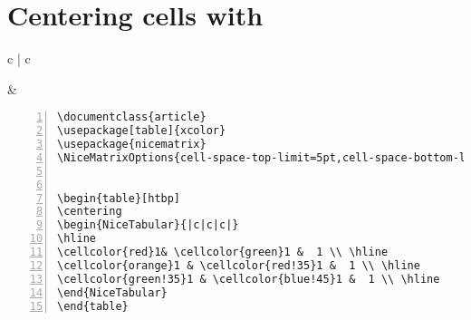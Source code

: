 \section{Centering cells with }
\begin{tabular}{c | c}
\begin{minipage}[m]{0.4\textwidth}
\end{minipage}
&
\begin{minipage}[m]{0.55\textwidth}
\renewcommand\textminus{\mbox{-}}%
\begin{lstlisting}[numberstyle=\zebra{green!15}{yellow!15},numbers=left,basicstyle=\footnotesize] 
\documentclass{article}
\usepackage[table]{xcolor}
\usepackage{nicematrix}
\NiceMatrixOptions{cell-space-top-limit=5pt,cell-space-bottom-limit=5pt}


\begin{table}[htbp]
\centering
\begin{NiceTabular}{|c|c|c|} 
\hline
\cellcolor{red}1& \cellcolor{green}1 &  1 \\ \hline 
\cellcolor{orange}1 & \cellcolor{red!35}1 &  1 \\ \hline
\cellcolor{green!35}1 & \cellcolor{blue!45}1 &  1 \\ \hline
\end{NiceTabular}
\end{table}

\end{lstlisting}
\end{minipage}
\end{tabular}



